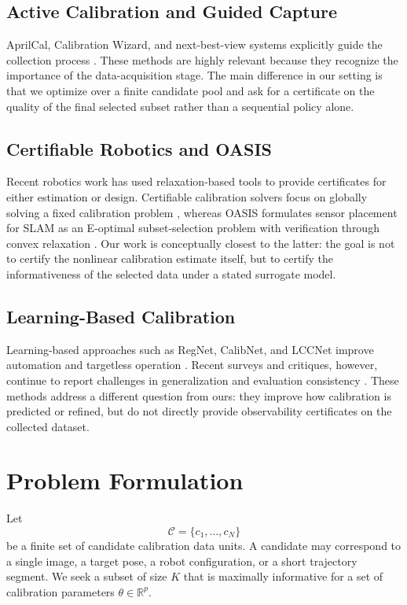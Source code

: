 \documentclass[11pt]{article}
\begin{document}
\subsection{Active Calibration and Guided Capture}
AprilCal, Calibration Wizard, and next-best-view systems explicitly guide the
collection process
\citep{richardson2013aprilcal,peng2019calibration,rojtberg2018efficient,yang2023nbv,wang2025active}.
These methods are highly relevant because they recognize the importance of the
data-acquisition stage. The main difference in our setting is that we optimize
over a finite candidate pool and ask for a certificate on the quality of the
final selected subset rather than a sequential policy alone.

\subsection{Certifiable Robotics and OASIS}
Recent robotics work has used relaxation-based tools to provide certificates for
either estimation or design. Certifiable calibration solvers focus on globally
solving a fixed calibration problem \citep{giamou2019certifiable}, whereas
OASIS formulates sensor placement for SLAM as an E-optimal subset-selection
problem with verification through convex relaxation \citep{kaveti2023oasis}. Our
work is conceptually closest to the latter: the goal is not to certify the
nonlinear calibration estimate itself, but to certify the informativeness of the
selected data under a stated surrogate model.

\subsection{Learning-Based Calibration}
Learning-based approaches such as RegNet, CalibNet, and LCCNet improve
automation and targetless operation
\citep{schneider2017regnet,iyer2018calibnet,lv2021lccnet}. Recent surveys and
critiques, however, continue to report challenges in generalization and
evaluation consistency \citep{liao2023survey,huang2025whatmatters}. These
methods address a different question from ours: they improve how calibration is
predicted or refined, but do not directly provide observability certificates on
the collected dataset.

\section{Problem Formulation}
Let
\begin{equation}
\mathcal{C} = \{c_1,\dots,c_N\}
\end{equation}
be a finite set of candidate calibration data units. A candidate may correspond
to a single image, a target pose, a robot configuration, or a short trajectory
segment. We seek a subset of size $K$ that is maximally informative for a set
of calibration parameters $\theta \in \mathbb{R}^p$.
\end{document}
